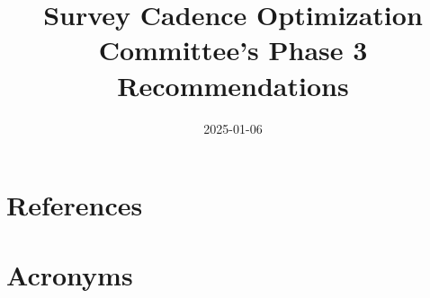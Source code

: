 \documentclass[PST,authoryear,toc]{lsstdoc}%
\title{Survey Cadence Optimization Committee’s Phase 3 Recommendations}
\date{2025-01-06}
\begin{document}
\maketitle



\clearpage

\clearpage

\clearpage

\clearpage

\clearpage

%


\appendix


\section{References} \label{sec:bib}
\renewcommand{\refname}{} %


\section{Acronyms} \label{sec:acronyms}

\end{document}
